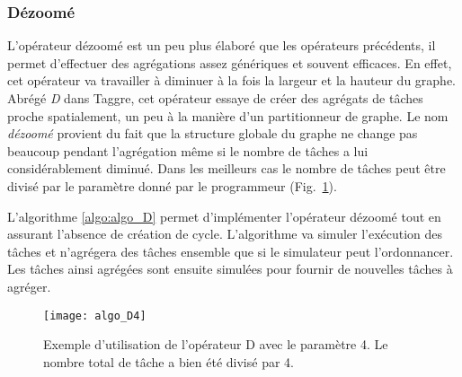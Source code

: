 \subsubsection{Dézoomé}
L'opérateur dézoomé est un peu plus élaboré que les opérateurs précédents, il permet d'effectuer des agrégations assez génériques et souvent efficaces.
%
En effet, cet opérateur va travailler à diminuer à la fois la largeur et la hauteur du graphe.
%
Abrégé {\em D} dans Taggre, cet opérateur essaye de créer des agrégats de tâches proche spatialement, un peu à la manière d'un partitionneur de graphe.
%
Le nom {\em dézoomé} provient du fait que la structure globale du graphe ne change pas beaucoup pendant l'agrégation même si le nombre de tâches a lui considérablement diminué.
%
Dans les meilleurs cas le nombre de tâches peut être divisé par le paramètre donné par le programmeur (Fig.~\ref{fig:algo_D4}).


L'algorithme \ref{algo:algo_D} permet d'implémenter l'opérateur dézoomé tout en assurant l'absence de création de cycle.
%
L'algorithme va simuler l'exécution des tâches et n'agrégera des tâches ensemble que si le simulateur peut l'ordonnancer.
%
Les tâches ainsi agrégées sont ensuite simulées pour fournir de nouvelles tâches à agréger.



\begin{figure}
  \centering
  \texttt{[image: algo\_D4]}
  \caption{Exemple d'utilisation de l'opérateur D avec le paramètre 4. Le nombre total de tâche a bien été divisé par 4.}
  \label{fig:algo_D4}
\end{figure}

